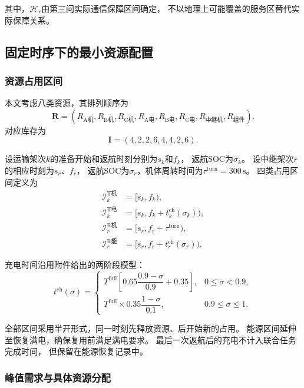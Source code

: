 \documentclass[bwprint]{gmcmthesis}
\begin{document}
其中，$\mathcal{H}_r$由第三问实际通信保障区间确定，
不以地理上可能覆盖的服务区替代实际保障关系。

\subsection{固定时序下的最小资源配置}

\subsubsection{资源占用区间}

本文考虑八类资源，其排列顺序为
\begin{equation}
\boldsymbol{R}=
\left(
R_{\mathrm{A机}},R_{\mathrm{B机}},R_{\mathrm{C机}},
R_{\mathrm{A电}},R_{\mathrm{B电}},R_{\mathrm{C电}},
R_{\mathrm{中继机}},R_{\mathrm{组件}}
\right).
\end{equation}
对应库存为
\begin{equation}
\boldsymbol{I}=(4,2,2,6,4,4,2,6).
\end{equation}

设运输架次$k$的准备开始和返航时刻分别为$s_k$和$f_k$，
返航SOC为$\sigma_k$。
设中继架次$r$的相应时刻为$s_r$、$f_r$，
返航SOC为$\sigma_r$，机体周转时间为$\tau^{\mathrm{turn}}=300\,\mathrm{s}$。
四类占用区间定义为
\begin{align}
\mathcal{I}^{\mathrm{T机}}_k
&=[s_k,f_k),\\
\mathcal{I}^{\mathrm{T电}}_k
&=[s_k,f_k+t^{\mathrm{ch}}_k(\sigma_k)),\\
\mathcal{I}^{\mathrm{R机}}_r
&=[s_r,f_r+\tau^{\mathrm{turn}}),\\
\mathcal{I}^{\mathrm{R能}}_r
&=[s_r,f_r+t^{\mathrm{ch}}_r(\sigma_r)).
\end{align}

充电时间沿用附件给出的两阶段模型：
\begin{equation}
t^{\mathrm{ch}}(\sigma)=
\begin{cases}
T^{\mathrm{full}}
\left[
0.65\dfrac{0.9-\sigma}{0.9}+0.35
\right],
&0\leq \sigma<0.9,\\[2mm]
T^{\mathrm{full}}\times0.35
\dfrac{1-\sigma}{0.1},
&0.9\leq \sigma\leq1.
\end{cases}
\end{equation}

全部区间采用半开形式，同一时刻先释放资源、后开始新的占用。
能源区间延伸至恢复满电，确保复用前满足满电要求。
最后一次返航后的充电不计入联合任务完成时间，
但保留在能源恢复记录中。

\subsubsection{峰值需求与具体资源分配}
\end{document}
